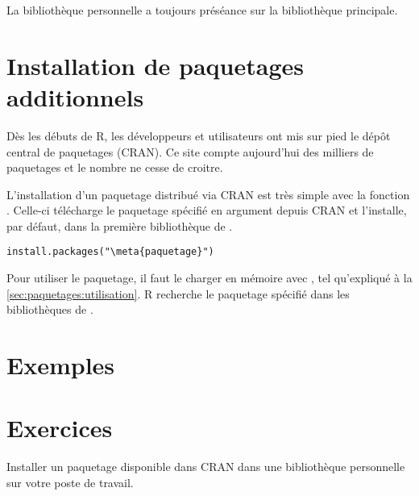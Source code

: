La bibliothèque personnelle a toujours préséance sur la bibliothèque
principale.



\section{Installation de paquetages additionnels}
\label{sec:paquetages:install}

Dès les débuts de R, les développeurs et utilisateurs ont mis sur pied
le dépôt central de paquetages
 (CRAN). Ce site compte aujourd'hui des milliers de
paquetages et le nombre ne cesse de croitre.

L'installation d'un paquetage distribué via CRAN est très simple avec
la fonction . Celle-ci télécharge le paquetage
spécifié en argument depuis CRAN et l'installe, par défaut, dans la
première bibliothèque de
.
\begin{Schunk}
\begin{Verbatim}[commandchars=\\\{\}]
install.packages("\meta{paquetage}")
\end{Verbatim}
\end{Schunk}

Pour utiliser le paquetage, il faut le charger en mémoire avec
, tel qu'expliqué à la
\autoref{sec:paquetages:utilisation}. R recherche le paquetage
spécifié dans les bibliothèques de
.



\section{Exemples}
\label{sec:paquetages:exemples}

\scriptfile{\scriptfilename}



\section{Exercices}
\label{sec:paquetages:exercices}

\begin{exercice}[nosol]
  Installer un paquetage disponible dans CRAN dans une bibliothèque
  personnelle sur votre poste de travail.
\end{exercice}

